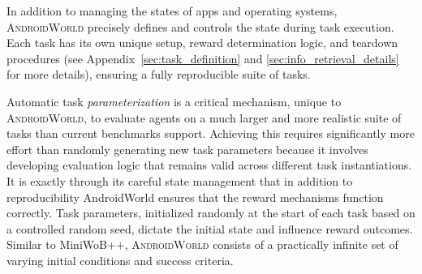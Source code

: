 \documentclass{article}
\newcommand{\system}{\textsc{AndroidWorld}\xspace}
\newcommand{\miniwob}{MiniWoB++\xspace}
\begin{document}
In addition to managing the states of apps and operating systems, \system precisely defines and controls the state during task execution. Each task has its own unique setup, reward determination logic, and teardown procedures (see Appendix~\ref{sec:task_definition} and \ref{sec:info_retrieval_details} for more details), ensuring a fully reproducible suite of tasks. 

Automatic task \textit{parameterization} is a critical mechanism, unique to \system, to evaluate agents on a much larger and more realistic suite of tasks than current benchmarks support. Achieving this requires significantly more effort than randomly generating new task parameters because it involves developing evaluation logic that remains valid across different task instantiations. It is exactly through its careful state management that in addition to reproducibility AndroidWorld ensures that the reward mechanisms function correctly. Task parameters, initialized randomly at the start of each task based on a controlled random seed, dictate the initial state and influence reward outcomes. Similar to \miniwob \citep{miniwob, web-workflows18}, \system consists of a practically infinite set of varying initial conditions and success criteria. 
\end{document}
